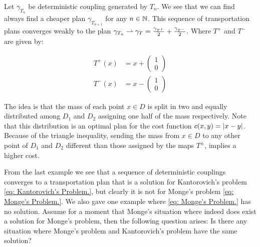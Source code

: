 Let $\gamma_{T_n}$ be deterministic coupling generated by $T_n$. We see that we can find always find a cheaper plan $\gamma_{T_{n+1}}$ for any $n\in \mathbb{N}$. This sequence of transportation plans converges weakly to the plan $\gamma_{T_n}\rightharpoonup \gamma_{T}=\frac{\gamma_{T^+}}{2}	+ \frac{\gamma_{T^-}}{2}$. Where $T^{+}$ and $T^{-}$ are given by:

\begin{align*}
T^{+}(x)&=x+\begin{pmatrix} 1 \\ 0\end{pmatrix}\\
T^{-}(x)&=x-\begin{pmatrix} 1 \\ 0\end{pmatrix}
\end{align*} 


The idea is that the mass of each point $x\in D$ is split in two and equally distributed among $D_1$ and $D_2$ assigning one half of the mass respectively. Note that this distribution is an optimal plan for the cost function $c(x,y)=\left| x-y \right|$. Because of the triangle inequality, sending the mass from $x\in D$ to any other point of $D_1$ and $D_2$ different than those assigned by the maps $T^{\pm}$, implies a higher cost.


From the last example we see that a sequence of deterministic couplings converges to a transportation plan that is a solution for Kantorovich's problem \eqref{eq: Kantorovich's Problem.}, but clearly it is not for Monge's problem \eqref{eq: Monge's Problem.}. We also gave one example where \eqref{eq: Monge's Problem.} has no solution. Assume for a moment that Monge's  situation where indeed does exist a solution for Monge's problem, then the following question arises: Is there any situation where Monge's problem and Kantorovich's problem have the same solution?

